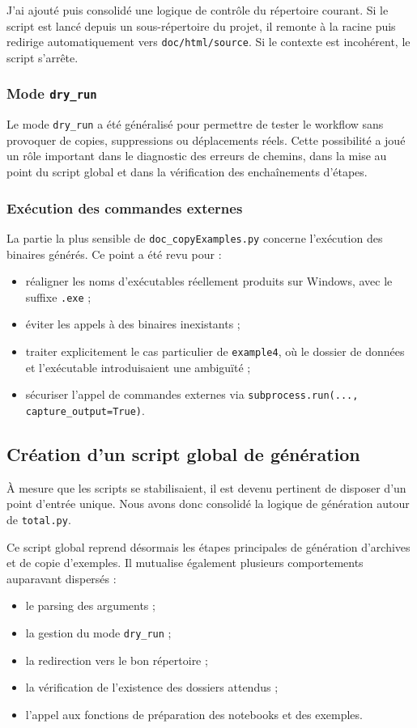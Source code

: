 \documentclass[a4paper,12pt,twoside]{article}
\begin{document}
J'ai ajouté puis consolidé une logique de contrôle du répertoire courant. Si le script est lancé depuis un sous-répertoire du projet, il remonte à la racine puis redirige automatiquement vers \texttt{doc/html/source}. Si le contexte est incohérent, le script s'arrête.

\subsubsection{Mode \texttt{dry\_run}}

Le mode \texttt{dry\_run} a été généralisé pour permettre de tester le workflow sans provoquer de copies, suppressions ou déplacements réels. Cette possibilité a joué un rôle important dans le diagnostic des erreurs de chemins, dans la mise au point du script global et dans la vérification des enchaînements d'étapes.

\subsubsection{Exécution des commandes externes}

La partie la plus sensible de \texttt{doc\_copyExamples.py} concerne l'exécution des binaires générés. Ce point a été revu pour :
\begin{itemize}
    \item réaligner les noms d'exécutables réellement produits sur Windows, avec le suffixe \texttt{.exe} ;
    \item éviter les appels à des binaires inexistants ;
    \item traiter explicitement le cas particulier de \texttt{example4}, où le dossier de données et l'exécutable introduisaient une ambiguïté ;
    \item sécuriser l'appel de commandes externes via \texttt{subprocess.run(..., capture\_output=True)}.
\end{itemize}

\subsection{Création d'un script global de génération}

À mesure que les scripts se stabilisaient, il est devenu pertinent de disposer d'un point d'entrée unique. Nous avons donc consolidé la logique de génération autour de \texttt{total.py}.

Ce script global reprend désormais les étapes principales de génération d'archives et de copie d'exemples. Il mutualise également plusieurs comportements auparavant dispersés :
\begin{itemize}
    \item le parsing des arguments ;
    \item la gestion du mode \texttt{dry\_run} ;
    \item la redirection vers le bon répertoire ;
    \item la vérification de l'existence des dossiers attendus ;
    \item l'appel aux fonctions de préparation des notebooks et des exemples.
\end{itemize}
\end{document}
